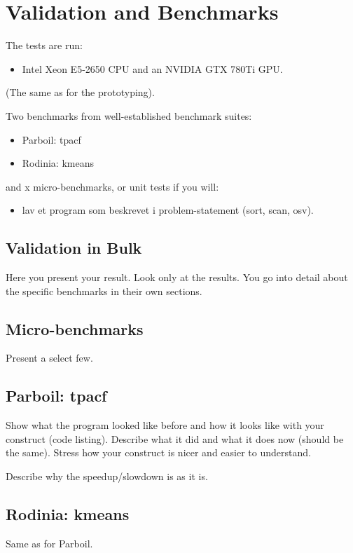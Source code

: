 \chapter{Validation and Benchmarks}
\label{chap:benchmarks}

The tests are run:
%
\begin{itemize}
  \item Intel Xeon E5-2650 CPU and an NVIDIA GTX 780Ti GPU.
\end{itemize}
%
(The same as for the prototyping).

Two benchmarks from well-established benchmark suites:
%
\begin{itemize}
\item Parboil: tpacf
\item Rodinia: kmeans
\end{itemize}
%
and x micro-benchmarks, or unit tests if you will:
%
\begin{itemize}
\item lav et program som beskrevet i problem-statement
  (sort, scan, osv).
\end{itemize}


\section{Validation in Bulk}

Here you present your result. Look only at the results. You
go into detail about the specific benchmarks in their own
sections.

\section{Micro-benchmarks}

Present a select few.


\section{Parboil: tpacf}

Show what the program looked like before and how it looks
like with your construct (code listing). Describe what it
did and what it does now (should be the same). Stress how
your construct is nicer and easier to understand.

Describe why the speedup/slowdown is as it is.


\section{Rodinia: kmeans}

Same as for Parboil.
